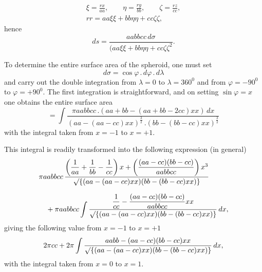 %
\[
\begin{gathered}
\xi=\frac{rx}{aa},\qquad\eta=\frac{ry}{bb},\qquad\zeta=\frac{rz}{cc},\\[4pt]
rr=aa\xi\xi+bb\eta\eta+cc\zeta\zeta,
\end{gathered}
\]
hence
\[
ds=\frac{aabbcc\,d\sigma}{{(aa\xi\xi+bb\eta\eta+cc\zeta\zeta}^{2}}.
\]

To determine the entire surface area of the spheroid, one must set
\[
d\sigma=\cos\varphi\,.\,d\varphi\,.\,d\lambda
\]
and carry out the double integration from $\lambda=0$ to $\lambda=360^0$ and from $\varphi=-90^0$ to $\varphi=+90^0$. The first integration is straightforward, and on setting $\sin\varphi=x$ one obtains the entire surface area
\[
=\int\frac{\pi aabbcc\,.(aa+bb-(aa+bb-2cc)xx)\,dx}{(aa-(aa-cc)xx)^{\frac32}\,.(bb-(bb-cc)xx)^{\frac32}}
\]
with the integral taken from $x=-1$ to $x=+1$.

This integral is readily transformed into the following expression (in general)
\[
\begin{aligned}
&\pi aabbcc\,\frac{\left(\dfrac1{aa}+\dfrac1{bb}-\dfrac1{cc}\right)x+\left(\dfrac{(aa-cc)(bb-cc)}{aabbcc}\right)x^3}{\mathord{\surd}\{(aa-(aa-cc)xx)(bb-(bb-cc)xx)\}}\\[7pt]
&\quad+\pi aabbcc\int\frac{\dfrac1{cc}-\dfrac{(aa-cc)(bb-cc)}{aabbcc}xx}{\mathord{\surd}\{(aa-(aa-cc)xx)(bb-(bb-cc)xx)\}}\,dx,
\end{aligned}
\]
giving the following value from $x=-1$ to $x=+1$
\[
2\pi cc+2\pi\int\frac{aabb-(aa-cc)(bb-cc)xx}{\mathord{\surd}\{(aa-(aa-cc)xx)(bb-(bb-cc)xx)\}}\,dx,
\]
with the integral taken from $x=0$ to $x=1$.
